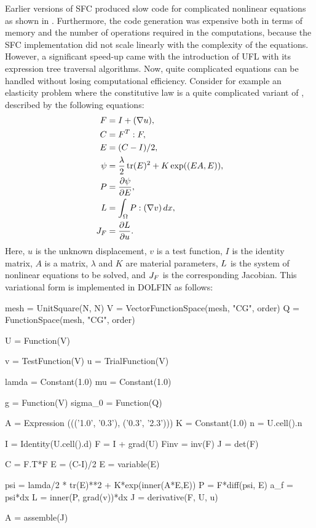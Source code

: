 Earlier versions of SFC produced slow code for complicated nonlinear
equations as shown in \citet{AlnaesMardal2009b}. Furthermore, the code
generation was expensive both in terms of memory and the number of
operations required in the computations, because the SFC implementation
did not scale linearly with the complexity of the equations.  However, a
significant speed-up came with the introduction of UFL with its expression
tree traversal algorithms.  Now, quite complicated equations can be
handled without losing computational efficiency. Consider for example
an elasticity problem where the constitutive law is a quite complicated
variant of \citet{Fung1993}, described by the following equations:
%
\begin{align}
F &= I + (\nabla u), \\
C &= F^T: F, \\
E &= (C-I)/2, \\
\psi &= \frac{\lambda}{2} \, \mbox{tr}(E)^2 + K\exp((E A,E)), \\
P &= \frac{\partial \psi}{\partial E}, \\
L &= \int_\Omega P: (\nabla v) \, dx, \\
J_F &= \frac{\partial L}{\partial u}.
\end{align}
Here, $u$ is the unknown displacement, $v$ is a
test function, $I$ is the identity matrix, $A$ is a
matrix, $\lambda$ and $K$ are material parameters, $L$ is the system
of nonlinear equations to be solved, and $J_F$ is the corresponding
Jacobian.  This variational form is implemented in DOLFIN as follows:
\begin{python}
mesh = UnitSquare(N, N)
V = VectorFunctionSpace(mesh, "CG", order)
Q = FunctionSpace(mesh, "CG", order)

U = Function(V)

v = TestFunction(V)
u = TrialFunction(V)

lamda = Constant(1.0)
mu = Constant(1.0)

g       = Function(V)
sigma_0 = Function(Q)

A = Expression ((('1.0', '0.3'), ('0.3', '2.3')))
K = Constant(1.0)
n = U.cell().n

I = Identity(U.cell().d)
F = I + grad(U)
Finv = inv(F)
J = det(F)

C = F.T*F
E = (C-I)/2
E = variable(E)

psi = lamda/2 * tr(E)**2  +  K*exp(inner(A*E,E))
P = F*diff(psi, E)
a_f = psi*dx
L = inner(P, grad(v))*dx
J = derivative(F, U, u)

A = assemble(J)
\end{python}

